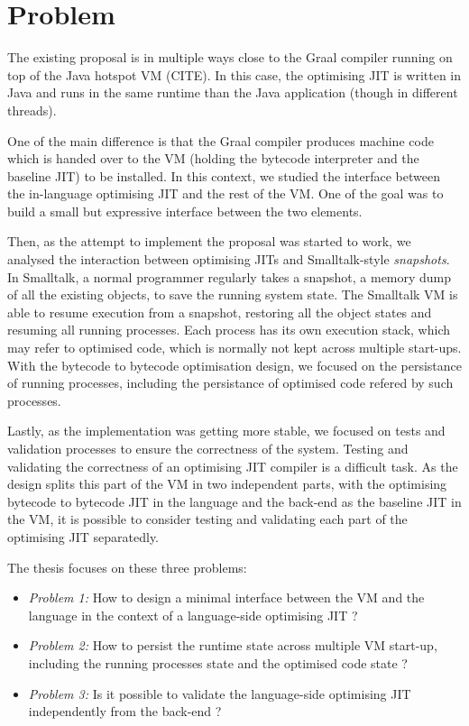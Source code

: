 \documentclass[a4paper,12pt,twoside]{../includes/ThesisStyle}
\begin{document}
\section{Problem}

The existing proposal is in multiple ways close to the Graal compiler running on top of the Java hotspot VM (CITE). In this case, the optimising JIT is written in Java and runs in the same runtime than the Java application (though in different threads). 

One of the main difference is that the Graal compiler produces machine code which is handed over to the VM (holding the bytecode interpreter and the baseline JIT) to be installed. In this context, we studied the interface between the in-language optimising JIT and the rest of the VM. One of the goal was to build a small but expressive interface between the two elements.

Then, as the attempt to implement the proposal was started to work, we analysed the interaction between optimising JITs and Smalltalk-style \emph{snapshots}. In Smalltalk, a normal programmer regularly takes a snapshot, a memory dump of all the existing objects, to save the running system state. The Smalltalk VM is able to resume execution from a snapshot, restoring all the object states and resuming all running processes. Each process has its own execution stack, which may refer to optimised code, which is normally not kept across multiple start-ups. With the bytecode to bytecode optimisation design, we focused on the persistance of running processes, including the persistance of optimised code refered by such processes.

Lastly, as the implementation was getting more stable, we focused on tests and validation processes to ensure the correctness of the system. Testing and validating the correctness of an optimising JIT compiler is a difficult task. As the design splits this part of the VM in two independent parts, with the optimising bytecode to bytecode JIT in the language and the back-end as the baseline JIT in the VM, it is possible to consider testing and validating each part of the optimising JIT separatedly.

The thesis focuses on these three problems:

\begin{itemize}
	\item \emph{Problem 1:} How to design a minimal interface between the VM and the language in the context of a language-side optimising JIT ?
	\item \emph{Problem 2:} How to persist the runtime state across multiple VM start-up, including the running processes state and the optimised code state ?
	\item \emph{Problem 3:} Is it possible to validate the language-side optimising JIT independently from the back-end ?
\end{itemize}
\end{document}
